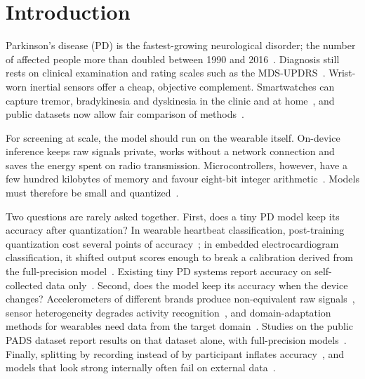 \documentclass[preprint,12pt]{elsarticle}
\begin{document}
\linenumbers

\section{Introduction}
\label{sec:intro}
Parkinson's disease (PD) is the fastest-growing neurological disorder; the number of affected people more than doubled between 1990 and 2016~\cite{GBD2018PD,Dorsey2018}. Diagnosis still rests on clinical examination and rating scales such as the MDS-UPDRS~\cite{Goetz2008,Postuma2015}. Wrist-worn inertial sensors offer a cheap, objective complement. Smartwatches can capture tremor, bradykinesia and dyskinesia in the clinic and at home~\cite{Rovini2017,Sigcha2023rev,Powers2021,Lipsmeier2018}, and public datasets now allow fair comparison of methods~\cite{Varghese2024,Bot2016,Monipar2023}.

For screening at scale, the model should run on the wearable itself. On-device inference keeps raw signals private, works without a network connection and saves the energy spent on radio transmission. Microcontrollers, however, have a few hundred kilobytes of memory and favour eight-bit integer arithmetic~\cite{David2021,Lin2020,Banbury2021,Ray2022}. Models must therefore be small and quantized~\cite{Jacob2018,Krishnamoorthi2018,Nagel2021}.

Two questions are rarely asked together. First, does a tiny PD model keep its accuracy after quantization? In wearable heartbeat classification, post-training quantization cost several points of accuracy~\cite{Nikandish2026}; in embedded electrocardiogram classification, it shifted output scores enough to break a calibration derived from the full-precision model~\cite{ElAllam2026}. Existing tiny PD systems report accuracy on self-collected data only~\cite{Parikh2026}. Second, does the model keep its accuracy when the device changes? Accelerometers of different brands produce non-equivalent raw signals~\cite{CoyleAsbil2026}, sensor heterogeneity degrades activity recognition~\cite{Stisen2015}, and domain-adaptation methods for wearables need data from the target domain~\cite{Zhu2025,Zheng2026}. Studies on the public PADS dataset report results on that dataset alone, with full-precision models~\cite{Varghese2024,Zannat2026}. Finally, splitting by recording instead of by participant inflates accuracy~\cite{Saeb2017,Kapoor2023}, and models that look strong internally often fail on external data~\cite{Zech2018,Kelly2019}.
\end{document}
